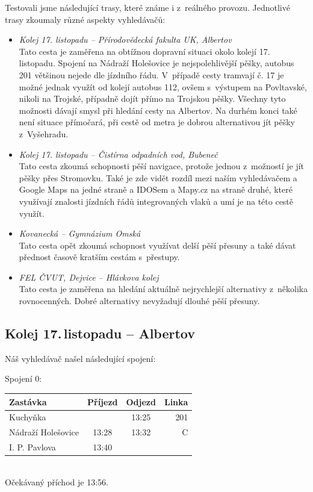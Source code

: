 Testovali jsme následující trasy, které známe i z~reálného provozu. Jednotlivé
trasy zkoumaly různé aspekty vyhledávačů:
\begin{itemize}
	\item {\em Kolej 17. listopadu -- Přírodovědecká fakulta UK, Albertov}\\ Tato
	cesta je zaměřena na obtížnou dopravní situaci okolo kolejí 17.
	listopadu. Spojení na Nádraží Holešovice je nejspolehlivější pěšky,
	autobus 201 většinou nejede dle jízdního řádu. V~případě cesty tramvají
	č. 17 je možné jednak využít od kolejí autobus 112, ovšem s~výstupem na
	Povltavské, nikoli na Trojské, případně dojít přímo na Trojskou pěšky.
	Všechny tyto možnosti dávají smysl při hledání cesty na Albertov. Na
	durhém konci také není situace přímočará, při cestě od metra je dobrou
	alternativou jít pěšky z~Vyšehradu. 
	\item {\em Kolej 17. listopadu -- Čistírna odpadních vod, Bubeneč}\\ Tato
	cesta zkoumá schopnosti pěší navigace, protože jednou z~možností je jít
	pěšky přes Stromovku. Také je zde vidět rozdíl mezi naším vyhledávačem a
	Google Maps na jedné straně a IDOSem a Mapy.cz na straně druhé, které
	využívají znalosti jízdních řádů integrovaných vlaků a umí je na této
	cestě využít.
	\item {\em Kovanecká -- Gymnázium Omská}\\ Tato cesta opět zkoumá schopnost
	využívat delší pěší přesuny a také dávat přednost časově kratším cestám
	s~přestupy. 
	\item {\em FEL ČVUT, Dejvice -- Hlávkova kolej}\\ Tato cesta je zaměřena na
	hledání aktuálně nejrychlejší alternativy z~několika rovnocenných. Dobré
	alternativy nevyžadují dlouhé pěší přesuny.
\end{itemize}
\subsection{Kolej 17.\,listopadu -- Albertov}

Náš vyhledávač našel následující spojení:

Spojení 0:\\[2mm]
\begin{tabular}{|l|c|c|r|}\hline
{\bf Zastávka}&{\bf Příjezd}&{\bf Odjezd}&{\bf Linka}\\\hline
Kuchyňka&&13:25&201\\\hline
Nádraží Holešovice&13:28&13:32&C\\\hline
I. P. Pavlova&13:40&&\\\hline
\end{tabular} \\[2mm]
Očekávaný příchod je 13:56.

